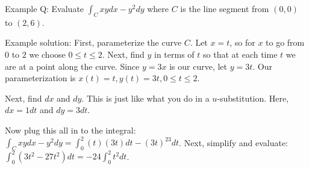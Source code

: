 \documentclass[12pt,letterpaper,noanswers]{exam}
\begin{document}
\begin{questions}
\begin{parts}
Example Q: Evaluate $\int_C x y dx - y^2 dy$ where $C$ is the line segment from $(0,0)$ to $(2,6)$.

Example solution: First, parameterize the curve $C$.  Let $x = t$, so for $x$ to go from $0$ to $2$ we choose $0 \leq t \leq 2$.  Next, find $y$ in terms of $t$ so that at each time $t$ we are at a point along the curve.  Since $y = 3x$ is our curve, let $y = 3t$.  Our parameterization is $x(t) = t, y(t) = 3t, 0\leq t\leq 2$.

Next, find $dx$ and $dy$.  This is just like what you do in a $u$-substitution.  Here, $dx = 1 dt$ and $dy = 3dt$.

Now plug this all in to the integral:  $\int_C xydx - y^2 dy = \int_0^2 (t)(3t)dt - (3t)^23dt$.  Next, simplify and evaluate:  $\int_0^2 (3t^2 - 27t^2)dt = -24 \int_0^2 t^2 dt$.



\end{parts}


\end{questions}
\end{document}
